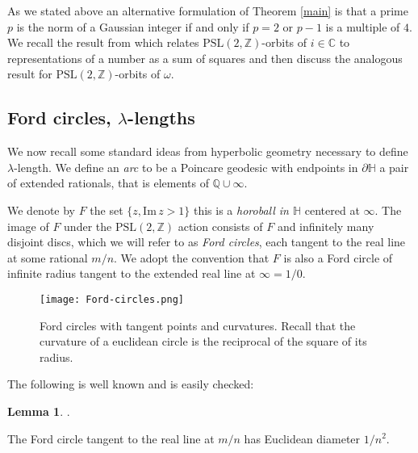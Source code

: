 \documentclass[12pt]{amsart}
\theoremstyle{plain}
\theoremstyle{definition}
\newtheorem{lem}[thm]{Lemma}
\def\HH{\mathbb{H}}
\def\im{\mathrm{Im}\,}
\def\ZZ{\mathbb{Z}}
\def\CC{\mathbb{C}}
\def\QQ{\mathbb{Q}}
\def\sl2{\mathrm{PSL}(2, \ZZ)}
\begin{document}
As we stated above an alternative formulation 
of Theorem \ref{main}  is that
a prime $p$ is the norm of a Gaussian integer
if and only if $p=2$ or $p-1$ is a multiple of $4$.
We recall the result from \cite{vlad} 
which relates $\sl2$-orbits of $i \in \CC$
to representations of a number as a sum of squares
and then discuss the analogous result for 
$\sl2$-orbits of $ \omega$.

\subsection{Ford circles, $\lambda$-lengths} 
\label{lengths}

We now recall some standard ideas from hyperbolic geometry
necessary to define $\lambda$-length.
We define an \textit{arc} to be a Poincare geodesic
with endpoints in $\partial \HH$ a pair of extended rationals, 
that is elements of $\QQ \cup \infty$.

We denote by $F$ the set  $\{ z, \im z > 1\}$
this is a \textit{horoball in $\HH$} centered at $\infty$.
The image of $F$ under the $\sl2$ action consists of
$F$ and infinitely many disjoint discs, 
which we will refer to as \textit{Ford circles}, 
each tangent to the real line at some rational $m/n$.
We adopt the convention that $F$ is also a Ford circle of infinite radius
tangent to the extended real line at $\infty = 1/0$.


  \begin{figure}[ht]
\begin{center}
\texttt{[image: Ford-circles.png]} 
\end{center}
\caption{Ford circles with tangent points and curvatures.
Recall that the 
curvature of a euclidean circle is the reciprocal of the square of its radius.}%
\end{figure}

The following is well known and is easily checked:

\begin{lem}\label{ford}.

The Ford circle tangent to the real line at $m/n$
has Euclidean diameter $1/n^2$.
\end{lem}

\end{document}
